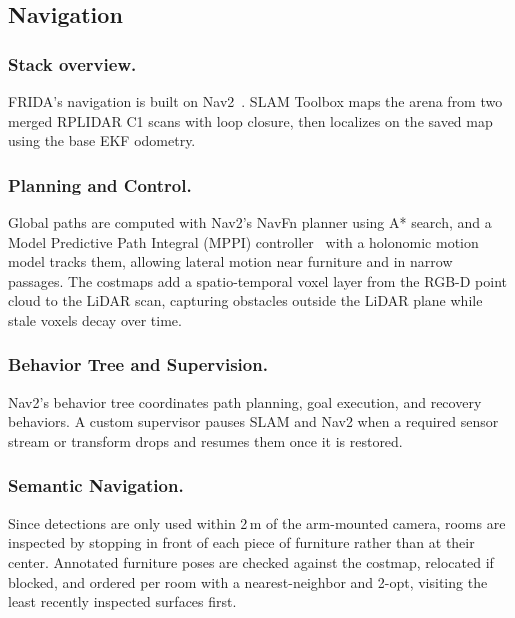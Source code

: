 \subsection{Navigation}

\subsubsection{Stack overview.}
FRIDA's navigation is built on Nav2~\cite{macenski2020marathon2}.
SLAM Toolbox maps the arena
from two merged RPLIDAR C1 scans with loop closure, then localizes on the
saved map using the base EKF odometry. 
\subsubsection{Planning and Control.}
Global paths are computed with Nav2's NavFn planner using A* search, and a 
Model Predictive Path Integral (MPPI) controller~\cite{williams2016mppi}
 with a holonomic motion model tracks them,
allowing lateral motion near furniture and in narrow passages. The costmaps
add a spatio-temporal voxel layer from the RGB-D point cloud to the LiDAR scan,
capturing obstacles outside the LiDAR plane while stale voxels decay over time.
\subsubsection{Behavior Tree and Supervision.}
Nav2's behavior tree coordinates path planning, goal execution, and recovery
behaviors. A custom supervisor pauses SLAM and Nav2 when a required sensor stream or transform drops and resumes them once it is restored. 
\subsubsection{Semantic Navigation.}
Since detections are only used within 2\,m of the arm-mounted camera, rooms are inspected by stopping in front of each piece of furniture rather than at their center. Annotated furniture poses are checked against the costmap, relocated if
blocked, and ordered per room with a nearest-neighbor and
2-opt, visiting the
least recently inspected surfaces first.